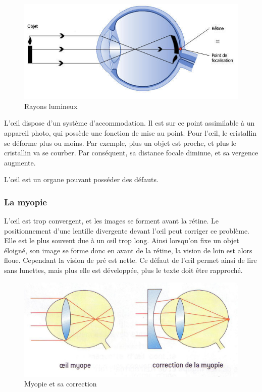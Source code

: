 \documentclass[a4paper, 12pt, onecolumn, openany]{report}
\begin{document}
	\begin{figure}[h]
	\begin{center}
	\includegraphics[scale=0.2]{rayons_lumineux.jpg}
	\end{center}
	\caption{Rayons lumineux}
	\label{Rayons lumineux}
	\end{figure}
		
	L’œil dispose d’un système d’accommodation. Il est sur ce point assimilable à un appareil photo, qui possède une fonction de mise au point. Pour l’œil, le cristallin se déforme plus ou moins. Par exemple, plus un objet est proche, et plus le cristallin va se courber. Par conséquent, sa distance focale diminue, et sa vergence augmente. 

	L’œil est un organe pouvant posséder des défauts.

\newpage
	\subsubsection{La myopie}
	L’œil est trop convergent, et les images se forment avant la rétine. Le positionnement d’une lentille divergente devant l’œil peut corriger ce problème.	Elle est le plus souvent due à un œil trop long. Ainsi lorsqu’on fixe un objet éloigné, son image se forme donc en avant de la rétine, la vision de loin est alors floue. Cependant la vision de pré est nette. Ce défaut de l’œil permet ainsi de lire sans lunettes, mais plus elle est développée, plus le texte doit être rapproché. 
	
	\begin{figure}[h]
	\begin{center}
	\includegraphics{myopie.jpg}
	\end{center}
	\caption{Myopie et sa correction}
	\label{Myopie et sa correction}
	\end{figure}
	
\end{document}
